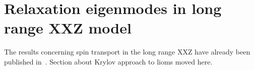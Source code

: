 \chapter{Relaxation eigenmodes in long range XXZ model}
\thispagestyle{chapterBeginStyle}

The results concerning spin transport in the long range XXZ have already been published in~\textcite{Mierzejewski2023}.
Section about Krylov approach to lioms moved here.